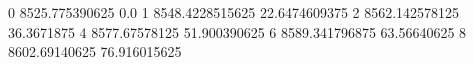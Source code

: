 0 8525.775390625 0.0
1 8548.4228515625 22.6474609375
2 8562.142578125 36.3671875
4 8577.67578125 51.900390625
6 8589.341796875 63.56640625
8 8602.69140625 76.916015625
